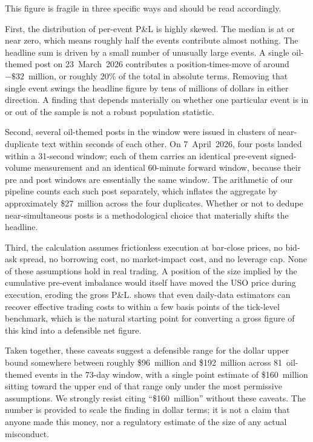 \documentclass[11pt,a4paper]{article}
\begin{document}
This figure is fragile in three specific ways and should be read accordingly.

First, the distribution of per-event P\&L is highly skewed. The median is at or near zero, which means roughly half the events contribute almost nothing. The headline sum is driven by a small number of unusually large events. A single oil-themed post on 23~March~2026 contributes a position-times-move of around $-\$32$~million, or roughly 20\% of the total in absolute terms. Removing that single event swings the headline figure by tens of millions of dollars in either direction. A finding that depends materially on whether one particular event is in or out of the sample is not a robust population statistic.

Second, several oil-themed posts in the window were issued in clusters of near-duplicate text within seconds of each other. On 7~April~2026, four posts landed within a 31-second window; each of them carries an identical pre-event signed-volume measurement and an identical 60-minute forward window, because their pre and post windows are essentially the same window. The arithmetic of our pipeline counts each such post separately, which inflates the aggregate by approximately \$27~million across the four duplicates. Whether or not to dedupe near-simultaneous posts is a methodological choice that materially shifts the headline.

Third, the calculation assumes frictionless execution at bar-close prices, no bid-ask spread, no borrowing cost, no market-impact cost, and no leverage cap. None of these assumptions hold in real trading. A position of the size implied by the cumulative pre-event imbalance would itself have moved the USO price during execution, eroding the gross P\&L. \citet{hasbrouck2009} shows that even daily-data estimators can recover effective trading costs to within a few basis points of the tick-level benchmark, which is the natural starting point for converting a gross figure of this kind into a defensible net figure.

Taken together, these caveats suggest a defensible range for the dollar upper bound somewhere between roughly \$96~million and \$192~million across 81~oil-themed events in the 73-day window, with a single point estimate of \$160~million sitting toward the upper end of that range only under the most permissive assumptions. We strongly resist citing ``\$160~million'' without these caveats. The number is provided to scale the finding in dollar terms; it is not a claim that anyone made this money, nor a regulatory estimate of the size of any actual misconduct.
\end{document}
